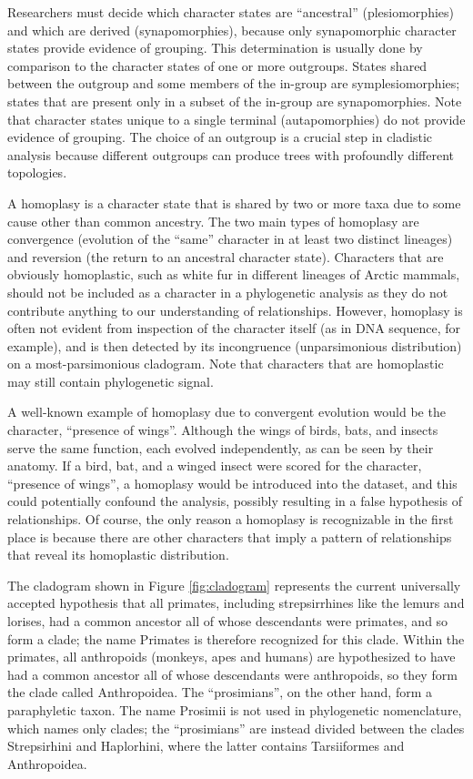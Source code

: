 Researchers must decide which character states are ``ancestral'' (plesiomorphies) and which are derived (synapomorphies), because only synapomorphic character states provide evidence of grouping. This determination is usually done by comparison to the character states of one or more outgroups. States shared between the outgroup and some members of the in-group are symplesiomorphies; states that are present only in a subset of the in-group are synapomorphies. Note that character states unique to a single terminal (autapomorphies) do not provide evidence of grouping. The choice of an outgroup is a crucial step in cladistic analysis because different outgroups can produce trees with profoundly different topologies.

A homoplasy is a character state that is shared by two or more taxa due to some cause other than common ancestry. The two main types of homoplasy are convergence (evolution of the ``same'' character in at least two distinct lineages) and reversion (the return to an ancestral character state). Characters that are obviously homoplastic, such as white fur in different lineages of Arctic mammals, should not be included as a character in a phylogenetic analysis as they do not contribute anything to our understanding of relationships. However, homoplasy is often not evident from inspection of the character itself (as in DNA sequence, for example), and is then detected by its incongruence (unparsimonious distribution) on a most-parsimonious cladogram. Note that characters that are homoplastic may still contain phylogenetic signal.

A well-known example of homoplasy due to convergent evolution would be the character, ``presence of wings''. Although the wings of birds, bats, and insects serve the same function, each evolved independently, as can be seen by their anatomy. If a bird, bat, and a winged insect were scored for the character, ``presence of wings'', a homoplasy would be introduced into the dataset, and this could potentially confound the analysis, possibly resulting in a false hypothesis of relationships. Of course, the only reason a homoplasy is recognizable in the first place is because there are other characters that imply a pattern of relationships that reveal its homoplastic distribution.

The cladogram shown in Figure \ref{fig:cladogram} represents the current universally accepted hypothesis that all primates, including strepsirrhines like the lemurs and lorises, had a common ancestor all of whose descendants were primates, and so form a clade; the name Primates is therefore recognized for this clade. Within the primates, all anthropoids (monkeys, apes and humans) are hypothesized to have had a common ancestor all of whose descendants were anthropoids, so they form the clade called Anthropoidea. The ``prosimians'', on the other hand, form a paraphyletic taxon. The name Prosimii is not used in phylogenetic nomenclature, which names only clades; the ``prosimians'' are instead divided between the clades Strepsirhini and Haplorhini, where the latter contains Tarsiiformes and Anthropoidea.



